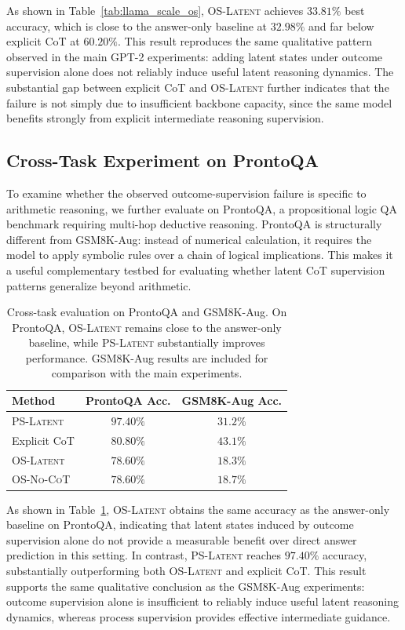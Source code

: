 As shown in Table~\ref{tab:llama_scale_os}, \textsc{OS-Latent} achieves $33.81\%$ best accuracy, which is close to the answer-only baseline at $32.98\%$ and far below explicit CoT at $60.20\%$.
This result reproduces the same qualitative pattern observed in the main GPT-2 experiments: adding latent states under outcome supervision alone does not reliably induce useful latent reasoning dynamics.
The substantial gap between explicit CoT and \textsc{OS-Latent} further indicates that the failure is not simply due to insufficient backbone capacity, since the same model benefits strongly from explicit intermediate reasoning supervision.

\subsection{Cross-Task Experiment on ProntoQA}
\label{app:prontoqa_os}

To examine whether the observed outcome-supervision failure is specific to arithmetic reasoning, we further evaluate on ProntoQA, a propositional logic QA benchmark requiring multi-hop deductive reasoning.
ProntoQA is structurally different from GSM8K-Aug: instead of numerical calculation, it requires the model to apply symbolic rules over a chain of logical implications.
This makes it a useful complementary testbed for evaluating whether latent CoT supervision patterns generalize beyond arithmetic.

\begin{table}[h]
\centering
\caption{Cross-task evaluation on ProntoQA and GSM8K-Aug. On ProntoQA, \textsc{OS-Latent} remains close to the answer-only baseline, while \textsc{PS-Latent} substantially improves performance. GSM8K-Aug results are included for comparison with the main experiments.}
\label{tab:prontoqa_generalization}
\begin{tabular}{lcc}
\toprule
\textbf{Method} & \textbf{ProntoQA Acc.} & \textbf{GSM8K-Aug Acc.} \\
\midrule
\textsc{PS-Latent} & $97.40\%$ & $31.2\%$ \\
Explicit CoT & $80.80\%$ & $43.1\%$ \\
\textsc{OS-Latent} & $78.60\%$ & $18.3\%$ \\
\textsc{OS-No-CoT} & $78.60\%$ & $18.7\%$ \\
\bottomrule
\end{tabular}
\end{table}

As shown in Table~\ref{tab:prontoqa_generalization}, \textsc{OS-Latent} obtains the same accuracy as the answer-only baseline on ProntoQA, indicating that latent states induced by outcome supervision alone do not provide a measurable benefit over direct answer prediction in this setting.
In contrast, \textsc{PS-Latent} reaches $97.40\%$ accuracy, substantially outperforming both \textsc{OS-Latent} and explicit CoT.
This result supports the same qualitative conclusion as the GSM8K-Aug experiments: outcome supervision alone is insufficient to reliably induce useful latent reasoning dynamics, whereas process supervision provides effective intermediate guidance.

